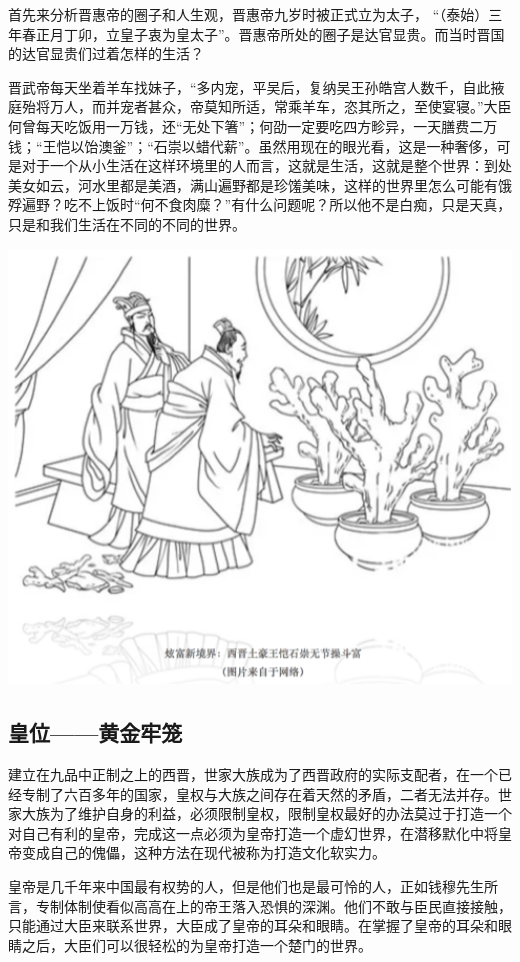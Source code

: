 \documentclass[]{book}
\begin{document}
首先来分析晋惠帝的圈子和人生观，晋惠帝九岁时被正式立为太子，
``（泰始）三年春正月丁卯，立皇子衷为皇太子''。晋惠帝所处的圈子是达官显贵。而当时晋国的达官显贵们过着怎样的生活？

晋武帝每天坐着羊车找妹子，``多内宠，平吴后，复纳吴王孙皓宫人数千，自此掖庭殆将万人，而并宠者甚众，帝莫知所适，常乘羊车，恣其所之，至使宴寝。''大臣何曾每天吃饭用一万钱，还``无处下箸''；何劭一定要吃四方畛异，一天膳费二万钱；``王恺以饴澳釜''；``石崇以蜡代薪''。虽然用现在的眼光看，这是一种奢侈，可是对于一个从小生活在这样环境里的人而言，这就是生活，这就是整个世界：到处美女如云，河水里都是美酒，满山遍野都是珍馐美味，这样的世界里怎么可能有饿殍遍野？吃不上饭时``何不食肉糜？''有什么问题呢？所以他不是白痴，只是天真，只是和我们生活在不同的不同的世界。

\includegraphics[width=6.67in]{images/his5}

\subsection{皇位------黄金牢笼}

建立在九品中正制之上的西晋，世家大族成为了西晋政府的实际支配者，在一个已经专制了六百多年的国家，皇权与大族之间存在着天然的矛盾，二者无法并存。世家大族为了维护自身的利益，必须限制皇权，限制皇权最好的办法莫过于打造一个对自己有利的皇帝，完成这一点必须为皇帝打造一个虚幻世界，在潜移默化中将皇帝变成自己的傀儡，这种方法在现代被称为打造文化软实力。

皇帝是几千年来中国最有权势的人，但是他们也是最可怜的人，正如钱穆先生所言，专制体制使看似高高在上的帝王落入恐惧的深渊。他们不敢与臣民直接接触，只能通过大臣来联系世界，大臣成了皇帝的耳朵和眼睛。在掌握了皇帝的耳朵和眼睛之后，大臣们可以很轻松的为皇帝打造一个楚门的世界。
\end{document}
